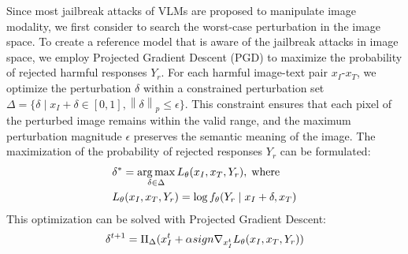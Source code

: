 Since most jailbreak attacks of VLMs are proposed to manipulate image modality, we first consider to search the  worst-case perturbation in the image space. To create a reference model that is aware of the jailbreak attacks in image space, we employ Projected Gradient Descent (PGD) \cite{pgd} to maximize the probability of rejected harmful responses $Y_{r}$. For each harmful image-text pair $x_I$-$x_T$, we optimize the perturbation $\delta$ within a constrained perturbation set $\Delta = \{ \delta \mid x_I+\delta \in [0,1], \left\|\delta\right\|_{p} \le \epsilon \}$. This constraint ensures that each pixel of the perturbed image remains within the valid range, and the maximum perturbation magnitude $\epsilon$ preserves the semantic meaning of the image. The maximization of the probability of rejected responses $Y_{r}$ can be formulated:
\vspace{-0.5em}
{\fontsize{10}{12}
\begin{align}
\label{equation 2}
&\delta^* = \argmax_{\delta \in \Delta} L_{\theta}(x_I, x_T, Y_{r}),\;\text{where}\\
&L_{\theta}(x_I, x_T, Y_{r}) = \log f_{\theta}(Y_{r} \mid x_I+\delta, x_T) 
\vspace{-0.5em}
\end{align}}
This optimization can be solved with Projected Gradient Descent:
\vspace{-0.5em}
\begin{equation}
\fontsize{10}{12}
\delta^{t+1} = \Pi_{\Delta} (x_I^t + \alpha sign\nabla_{x_I^t} L_{\theta}(x_I, x_T, Y_{r})) 
\end{equation}
\vspace{-0.5em}

